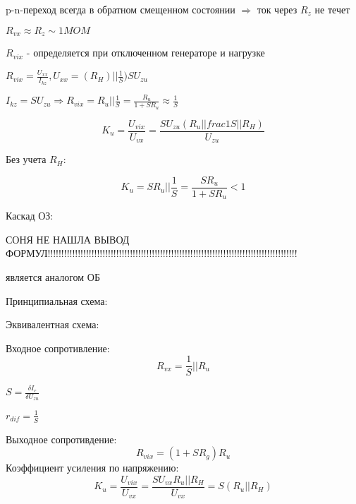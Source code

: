 p-n-переход всегда в обратном смещенном состоянии $\Rightarrow$ ток через $R_z$ не течет

$R_{vx}\approx R_z\sim 1MOM$

$R_{vix}$ - определяется при отключенном генераторе и нагрузке

$R_{vix}=\frac{U_{xx}}{I_{kz}}, U_{xx}=(R_H)||\frac1S)SU_{zu}$

$I_{kz}=SU_{zu}\Rightarrow R_{vix}=R_u||\frac1S=\frac{R_u}{1+SR_u}\approx \frac1S$

$$
K_u=\frac{U_{vix}}{U_{vx}}=\frac{SU_{zu}(R_u||frac1S||R_H)}{U_{zu}}
$$

Без учета $R_H$:

$$
K_u=SR_u||\frac1S=\frac{SR_u}{1+SR_u}<1
$$

Каскад ОЗ:

СОНЯ НЕ НАШЛА ВЫВОД ФОРМУЛ!!!!!!!!!!!!!!!!!!!!!!!!!!!!!!!!!!!!!!!!!!!!!!!!!!!!!!!!!!!!!!!!!!!!!!!!!!!!!!!!!!!!!!!!!!!

является аналогом ОБ

\pagebreak
Принципиальная схема:
\begin{center}
	\begin{figure}[h!]
	\end{figure}
\end{center}
Эквивалентная схема:
\begin{center}
	\begin{figure}[h!]
	\end{figure}
\end{center}

Входное сопротивление:
$$
R_{vx}=\frac1S||R_u
$$

$S=\frac{\delta I_c}{\delta U_{zn}}$

$r_{dif}=\frac1S$

Выходное сопротивдение:
$$
R_{vix}=(1+SR_g)R_u
$$
Коэффициент усиления по напряжению:
$$
K_u=\frac{U_{vix}}{U_{vx}}=\frac{SU_{vx}R_u||R_H}{U_{vx}}=S(R_u||R_H)
$$